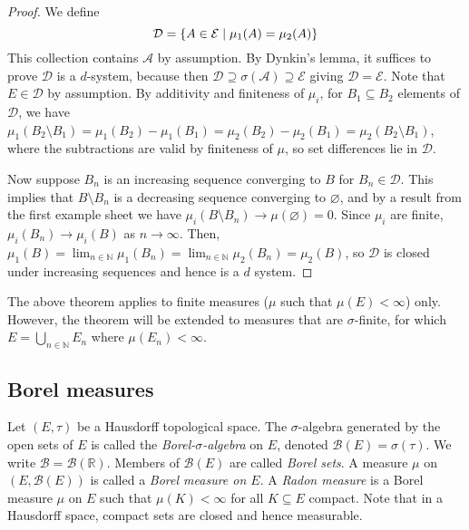 \begin{proof}
	We define
	\[ \mathcal D = \qty{A \in \mathcal E \mid \mu_1(A) = \mu_2(A)} \]
	This collection contains \( \mathcal A \) by assumption.
	By Dynkin's lemma, it suffices to prove \( \mathcal D \) is a \( d \)-system, because then \( \mathcal D \supseteq \sigma(\mathcal A) \supseteq \mathcal E \) giving \( \mathcal D = \mathcal E \).
	Note that \( E \in \mathcal D \) by assumption.
	By additivity and finiteness of \( \mu_i \), for \( B_1 \subseteq B_2 \) elements of \( \mathcal D \), we have \( \mu_1(B_2 \setminus B_1) = \mu_1(B_2) - \mu_1(B_1) = \mu_2(B_2) - \mu_2(B_1) = \mu_2(B_2 \setminus B_1) \), where the subtractions are valid by finiteness of \( \mu \), so set differences lie in \( \mathcal D \).

	Now suppose \( B_n \) is an increasing sequence converging to \( B \) for \( B_n \in \mathcal D \).
	This implies that \( B \setminus B_n \) is a decreasing sequence converging to \( \varnothing \), and by a result from the first example sheet we have \( \mu_i(B \setminus B_n) \to \mu(\varnothing) = 0 \).
	Since \( \mu_i \) are finite, \( \mu_i(B_n) \to \mu_i(B) \) as \( n \to \infty \).
	Then, \( \mu_1(B) = \lim_{n \in \mathbb N} \mu_1(B_n) = \lim_{n \in \mathbb N} \mu_2(B_n) = \mu_2(B) \), so \( \mathcal D \) is closed under increasing sequences and hence is a \( d \) system.
\end{proof}
\begin{remark}
	The above theorem applies to finite measures (\( \mu \) such that \( \mu(E) < \infty \)) only.
	However, the theorem will be extended to measures that are \( \sigma \)-finite, for which \( E = \bigcup_{n \in \mathbb N} E_n \) where \( \mu(E_n) < \infty \).
\end{remark}

\subsection{Borel measures}
\begin{definition}
	Let \( (E, \tau) \) be a Hausdorff topological space.
	The \( \sigma \)-algebra generated by the open sets of \( E \) is called the \emph{Borel-\( \sigma \)-algebra} on \( E \), denoted \( \mathcal B(E) = \sigma(\tau) \).
	We write \( \mathcal B = \mathcal B(\mathbb R) \).
	Members of \( \mathcal B(E) \) are called \emph{Borel sets}.
	A measure \( \mu \) on \( (E, \mathcal B(E)) \) is called a \emph{Borel measure on \( E \)}.
	A \emph{Radon measure} is a Borel measure \( \mu \) on \( E \) such that \( \mu(K) < \infty \) for all \( K \subseteq E \) compact.
	Note that in a Hausdorff space, compact sets are closed and hence measurable.
\end{definition}

